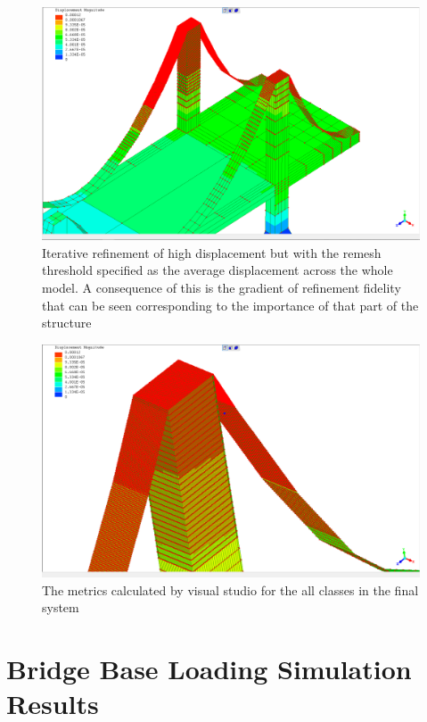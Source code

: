 \begin{figure}[h!!]
  \centerline{\includegraphics[width=165mm, scale=0.5]{../Graphics/BridgeCrossLoading/aboveAverageRefinement2.png}}
  \caption{Iterative refinement of high displacement but with the remesh threshold specified as the average displacement across the whole model. A consequence of this is the gradient of refinement fidelity that can be seen corresponding to the importance of that part of the structure}
\end{figure}


\begin{figure}[h!!]
  \centerline{\includegraphics[width=165mm, scale=0.5]{../Graphics/BridgeCrossLoading/aboveAverageRefinement.png}}
  \caption{The metrics calculated by visual studio for the all classes in the final system}
\end{figure}


\section{Bridge Base Loading Simulation Results}


